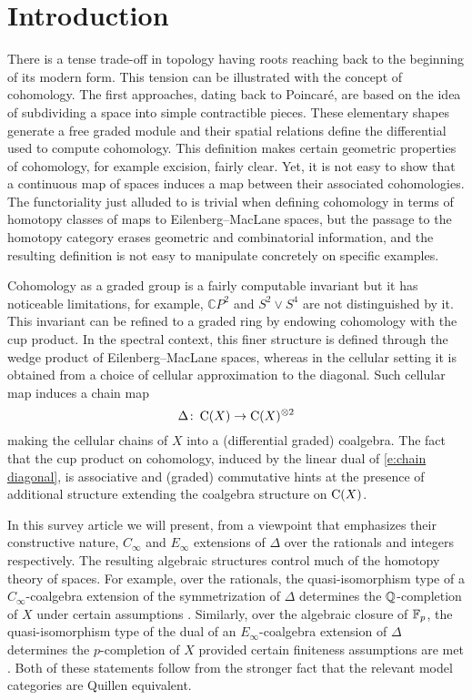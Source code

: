
\section{Introduction} \label{s:introduction}

There is a tense trade-off in topology having roots reaching back to the beginning of its modern form.
This tension can be illustrated with the concept of cohomology.
The first approaches, dating back to Poincar\'e, are based on the idea of subdividing a space into simple contractible pieces.
These elementary shapes generate a free graded module and their spatial relations define the differential used to compute cohomology.
This definition makes certain geometric properties of cohomology, for example excision, fairly clear.
Yet, it is not easy to show that a continuous map of spaces induces a map between their associated cohomologies.
The functoriality just alluded to is trivial when defining cohomology in terms of homotopy classes of maps to Eilenberg--MacLane spaces, but the passage to the homotopy category erases geometric and combinatorial information, and the resulting definition is not easy to manipulate concretely on specific examples.

Cohomology as a graded group is a fairly computable invariant but it has noticeable limitations, for example, $\mathbb{C} P^2$ and $S^2 \vee S^4$ are not distinguished by it.
This invariant can be refined to a graded ring by endowing cohomology with the cup product.
In the spectral context, this finer structure is defined through the wedge product of Eilenberg--MacLane spaces, whereas in the cellular setting it is obtained from a choice of
cellular approximation to the diagonal.
Such cellular map induces a chain map
\begin{equation} \label{e:chain diagonal}
\Delta \colon \operatorname{C}(X) \to \operatorname{C}(X)^{\otimes 2}
\end{equation}
making the cellular chains of $X$ into a (differential graded) coalgebra.
The fact that the cup product on cohomology, induced by the linear dual of \eqref{e:chain diagonal}, is associative and (graded) commutative hints at the presence of additional structure extending the coalgebra structure on $\operatorname{C}(X)$.

In this survey article we will present, from a viewpoint that emphasizes their constructive nature, $C_\infty$ and $E_\infty$ extensions of $\Delta$ over the rationals and integers respectively.
The resulting algebraic structures control much of the homotopy theory of spaces.
For example, over the rationals, the quasi-isomorphism type of a $C_\infty$-coalgebra extension of the symmetrization of $\Delta$ determines the $\mathbb{Q}$-completion of $X$ under certain assumptions \cite{quillen1969rational, buijs2020liemodels}.
Similarly, over the algebraic closure of ${\mathbb{F}_p}$, the quasi-isomorphism type of the dual of an $E_\infty$-coalgebra extension of $\Delta$ determines the $p$-completion of $X$ provided certain finiteness assumptions are met \cite{mandell2001padic}.
Both of these statements follow from the stronger fact that the relevant model categories are Quillen equivalent.


